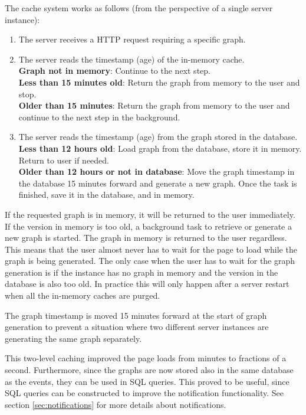 The cache system works as follows (from the perspective of a single server instance):
\begin{enumerate}
    \item The server receives a HTTP request requiring a specific graph.
    \item The server reads the timestamp (age) of the in-memory cache. \\
    \textbf{Graph not in memory}: Continue to the next step.\\
    \textbf{Less than 15 minutes old}: Return the graph from memory to the user and stop. \\
    \textbf{Older than 15 minutes}: Return the graph from memory to the user and continue to the next step in the background.
    \item The server reads the timestamp (age) from the graph stored in the database.\\
    \textbf{Less than 12 hours old}: Load graph from the database, store it in memory. Return to user if needed.\\
    \textbf{Older than 12 hours or not in database}: Move the graph timestamp in the database 15 minutes forward and generate a new graph. Once the task is finished, save it in the database, and in memory.
\end{enumerate}

If the requested graph is in memory, it will be returned to the user immediately. 
If the version in memory is too old, a background task to retrieve or generate a new graph is started. 
The graph in memory is returned to the user regardless. 
This means that the user almost never has to wait for the page to load while the graph is being generated.
The only case when the user has to wait for the graph generation is if the instance has no graph in memory and the version in the database is also too old.
In practice this will only happen after a server restart when all the in-memory caches are purged.

The graph timestamp is moved 15 minutes forward at the start of graph generation to prevent a situation where two different server instances are generating the same graph separately.

This two-level caching improved the page loads from minutes to fractions of a second. Furthermore, since the graphs are now stored also in the same database as the events, they can be used in SQL queries. This proved to be useful, since SQL queries can be constructed to improve the notification functionality. See section \ref{sec:notifications} for more details about notifications.

